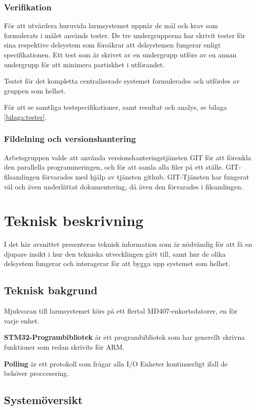 \documentclass{article}
\begin{document}
\subsubsection{Verifikation}
\label{verifikation}
För att utvärdera huruvida larmsystemet uppnår de mål och krav som formulerats i målet används tester.
De tre undergrupperna har skrivit tester för sina respektive delsystem som försäkrar att
delsystemen fungerar enligt specifikationen. Ett test som är skrivet av en undergrupp utförs
av en annan undergrupp för att minimera partiskhet i utförandet.

Testet för det kompletta centraliserade systemet formulerades och utfördes av gruppen som helhet.

För att se samtliga testspecifikationer, samt resultat och analys, se bilaga \ref{bilaga:tester}.

\subsubsection{Fildelning och versionshantering}
Arbetsgruppen valde att använda versionshanteringstjänsten GIT för att förenkla den parallella programmeringen, och för att samla alla filer på ett ställe. GIT-filsamlingen förvarades med hjälp av tjänsten github. GIT-Tjänsten har fungerat väl och även underlättat dokumentering, då även den förvarades i filsamlingen.

\newpage
\section{Teknisk beskrivning} %
I det här avsnittet presenteras teknisk information som är nödvändig för att få en djupare insikt i hur den tekniska utvecklingen gått till, samt hur de olika delsystem fungerar och interagerar för att bygga upp systemet som helhet.
\subsection{Teknisk bakgrund}
Mjukvaran till larmsystemet körs på ett flertal MD407-enkortsdatorer, en för varje enhet.

\textbf{STM32-Programbibliotek}\cite{stm} är ett programbibliotek som har generellt skrivna funktioner som
redan skrivits för ARM.

\textbf{Polling} är ett protokoll som frågar alla I/O Enheter kontinuerligt ifall de behöver proccesering.\subsection{Systemöversikt}
\end{document}
